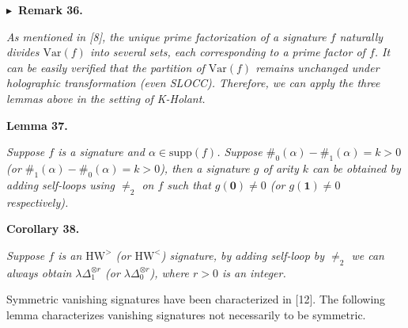 



\par\medskip\noindent\textbf{
$\blacktriangleright$ Remark 36.
}\par



\emph{As mentioned in [8], the unique prime factorization of a signature $f$ naturally divides $\text{Var}(f)$ into several sets, each corresponding to a prime factor of $f$. It can be easily verified that the partition of $\text{Var}(f)$ remains unchanged under holographic transformation (even SLOCC). Therefore, we can apply the three lemmas above in the setting of K-Holant.}\par







\par\medskip\noindent\textbf{
\textbf{Lemma 37}\textbf{.}
}\par



\emph{Suppose $f$ is a signature and $\alpha\in\text{supp}(f)$. Suppose $\#_{0}(\alpha)-\#_{1}(\alpha)=k>0$ (or $\#_{1}(\alpha)-\#_{0}(\alpha)=k>0$), then a signature $g$ of arity $k$ can be obtained by adding self-loops using $\neq_{2}$ on $f$ such that $g(\textbf{0})\neq 0$ (or $g(\textbf{1})\neq 0$ respectively).}\par







\par\medskip\noindent\textbf{
\textbf{Corollary 38}\textbf{.}
}\par



\emph{Suppose $f$ is an $\text{HW}^{>}$ (or $\text{HW}^{<}$) signature, by adding self-loop by $\neq_{2}$ we can always obtain $\lambda\Delta_{1}^{\otimes r}$ (or $\lambda\Delta_{0}^{\otimes r}$), where $r>0$ is an integer.}\par






Symmetric vanishing signatures have been characterized in [12]. The following lemma characterizes vanishing signatures not necessarily to be symmetric.\par



